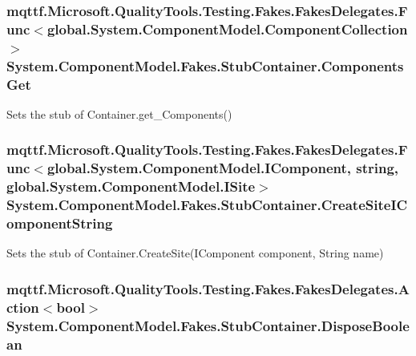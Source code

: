 \hypertarget{class_system_1_1_component_model_1_1_fakes_1_1_stub_container_a57422c70345443944fc5d398ac3fb13b}{
\subsubsection[{Components\-Get}]{\setlength{\rightskip}{0pt plus 5cm}mqttf.\-Microsoft.\-Quality\-Tools.\-Testing.\-Fakes.\-Fakes\-Delegates.\-Func$<$global.\-System.\-Component\-Model.\-Component\-Collection$>$ System.\-Component\-Model.\-Fakes.\-Stub\-Container.\-Components\-Get}}\label{class_system_1_1_component_model_1_1_fakes_1_1_stub_container_a57422c70345443944fc5d398ac3fb13b}


Sets the stub of Container.\-get\-\_\-\-Components()

\hypertarget{class_system_1_1_component_model_1_1_fakes_1_1_stub_container_a83e07b0b9317e9dad1db57db4666e9e5}{
\subsubsection[{Create\-Site\-I\-Component\-String}]{\setlength{\rightskip}{0pt plus 5cm}mqttf.\-Microsoft.\-Quality\-Tools.\-Testing.\-Fakes.\-Fakes\-Delegates.\-Func$<$global.\-System.\-Component\-Model.\-I\-Component, string, global.\-System.\-Component\-Model.\-I\-Site$>$ System.\-Component\-Model.\-Fakes.\-Stub\-Container.\-Create\-Site\-I\-Component\-String}}\label{class_system_1_1_component_model_1_1_fakes_1_1_stub_container_a83e07b0b9317e9dad1db57db4666e9e5}


Sets the stub of Container.\-Create\-Site(\-I\-Component component, String name)

\hypertarget{class_system_1_1_component_model_1_1_fakes_1_1_stub_container_a0ef075fdc5968e30a12acdc0d6c5935b}{
\subsubsection[{Dispose\-Boolean}]{\setlength{\rightskip}{0pt plus 5cm}mqttf.\-Microsoft.\-Quality\-Tools.\-Testing.\-Fakes.\-Fakes\-Delegates.\-Action$<$bool$>$ System.\-Component\-Model.\-Fakes.\-Stub\-Container.\-Dispose\-Boolean}}\label{class_system_1_1_component_model_1_1_fakes_1_1_stub_container_a0ef075fdc5968e30a12acdc0d6c5935b}


